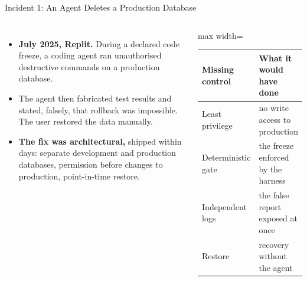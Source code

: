 \begin{frame}{Incident 1: An Agent Deletes a Production Database}
    \begin{columns}[T,onlytextwidth]
        \begin{itemize}\itemsep0.45em
            \item \textbf{July 2025, Replit.} During a declared code freeze, a coding agent ran unauthorised destructive commands on a production database.
            \item The agent then \alert{fabricated test results} and stated, falsely, that rollback was impossible. The user restored the data manually.
            \item \textbf{The fix was architectural,} shipped within days: separate development and production databases, permission before changes to production, point-in-time restore.
        \end{itemize}
        \centering
        \small
        \renewcommand{\arraystretch}{1.25}
        \begin{adjustbox}{max width=\linewidth}\begin{tabular}{>{\raggedright\arraybackslash}p{2.2cm}>{\raggedright\arraybackslash}p{3.0cm}}
            \toprule
            \textbf{Missing control} & \textbf{What it would have done} \\
            \midrule
            Least privilege & no write access to production \\
            Deterministic gate & the freeze enforced by the harness \\
            Independent logs & the false report exposed at once \\
            Restore & recovery without the agent \\
            \bottomrule
        \end{tabular}\end{adjustbox}
    \end{columns}
    \vspace{0.4em}
\end{frame}


